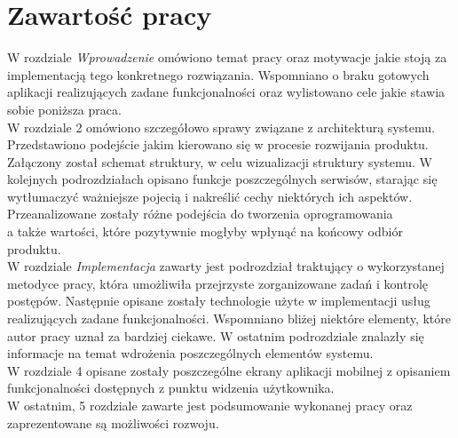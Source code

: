 \section{Zawartość pracy}
\label{sec:zawartoscPracy}
W rozdziale \textit{Wprowadzenie} omówiono temat pracy oraz motywacje jakie stoją za implementacją tego konkretnego rozwiązania. Wspomniano o braku gotowych aplikacji realizujących zadane funkcjonalności oraz wylistowano cele jakie stawia sobie poniższa praca.
\\W rozdziale 2 omówiono szczegółowo sprawy związane z architekturą systemu. Przedstawiono podejście jakim kierowano się w procesie rozwijania produktu. Załączony został schemat struktury, w celu wizualizacji struktury systemu. W kolejnych podrozdziałach opisano funkcje poszczególnych serwisów, starając się wytłumaczyć ważniejsze pojecią i nakreślić cechy niektórych ich aspektów. Przeanalizowane zostały różne podejścia do tworzenia oprogramowania\\ a także wartości, które pozytywnie mogłyby wpłynąć na końcowy odbiór produktu.
\\W rozdziale \textit{Implementacja} zawarty jest podrozdział traktujący o wykorzystanej metodyce pracy, która umożliwiła przejrzyste zorganizowane zadań i kontrolę postępów. Następnie opisane zostały technologie użyte w implementacji usług realizujących zadane funkcjonalności. Wspomniano bliżej niektóre elementy, które autor pracy uznał za bardziej ciekawe. W ostatnim podrozdziale znalazły się informacje na temat wdrożenia poszczególnych elementów systemu.
\\W rozdziale 4 opisane zostały poszczególne ekrany aplikacji mobilnej z opisaniem funkcjonalności dostępnych z punktu widzenia użytkownika.
\\W ostatnim, 5 rozdziale zawarte jest podsumowanie wykonanej pracy oraz zaprezentowane są możliwości rozwoju.
